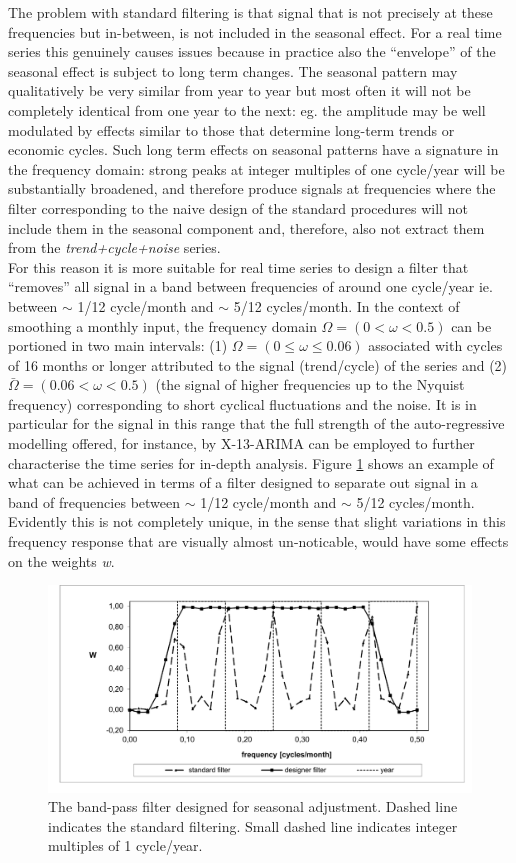 \documentclass[english,blauw]{cbsdiscussionpaper}
\begin{document}
The problem with standard filtering is that signal that is not precisely at these frequencies but in-between, is not included in the seasonal effect. For a real time series this genuinely causes issues because in practice also the ``envelope'' of the seasonal effect is subject to long term changes. The seasonal pattern may qualitatively be very similar from year to year but most often it will not be completely identical from one year to the next: eg. the amplitude may be well modulated by effects similar to those that determine long-term trends or economic cycles. Such long term effects on seasonal patterns have a signature in the frequency domain: strong peaks at integer multiples of one cycle/year will be substantially broadened, and therefore produce signals at frequencies where the filter corresponding to the naive design of the standard procedures will not include them in the seasonal component and, therefore, also not extract them from the \textit{trend+cycle+noise} series.\\For this reason it is more suitable for real time series to design a filter that ``removes'' all signal in a band between frequencies of around one cycle/year ie. between $\sim$ 1/12 cycle/month and $\sim$ 5/12 cycles/month. In the context of smoothing a monthly input, the frequency domain $\Omega=(0<\omega<0.5)$ can be portioned in two main intervals: (1) $\Omega=(0 \leq \omega \leq 0.06)$ associated with cycles of 16 months or longer attributed to the signal (trend/cycle) of the series and (2) $\bar{\Omega}=(0.06 < \omega < 0.5)$ (the signal of higher frequencies up to the Nyquist frequency) corresponding to short cyclical fluctuations and the noise. It is in particular for the signal in this range that the full strength of the auto-regressive modelling offered, for instance, by X-13-ARIMA can be employed to further characterise the time series for in-depth analysis. Figure \ref{fig:filters} shows an example of what can be achieved in terms of a filter designed to separate out signal in a band of frequencies between $\sim$ 1/12 cycle/month and $\sim$ 5/12 cycles/month. Evidently this is not completely unique, in the sense that slight variations in this frequency response that are visually almost un-noticable, would have some effects on the weights \textit{w}.
\begin{figure}[h]
 \includegraphics[width=\linewidth]{../images/capitolo2/filters.pdf}
 \caption{The band-pass filter designed for seasonal adjustment. Dashed line indicates the standard filtering. Small dashed line indicates integer multiples of 1 cycle/year.}
 \label{fig:filters}
\end{figure}
\end{document}
